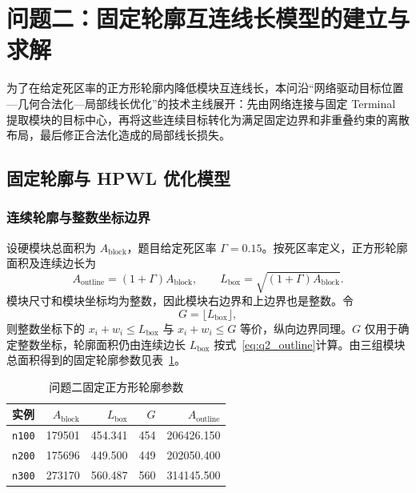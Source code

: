 \section{问题二：固定轮廓互连线长模型的建立与求解}

为了在给定死区率的正方形轮廓内降低模块互连线长，本问沿“网络驱动目标位置—几何合法化—局部线长优化”的技术主线展开：先由网络连接与固定 Terminal 提取模块的目标中心，再将这些连续目标转化为满足固定边界和非重叠约束的离散布局，最后修正合法化造成的局部线长损失。

\subsection{固定轮廓与 HPWL 优化模型}

\subsubsection{连续轮廓与整数坐标边界}

设硬模块总面积为 $A_{\mathrm{block}}$，题目给定死区率 $\Gamma=0.15$。按死区率定义，正方形轮廓面积及连续边长为
\begin{equation}
  A_{\mathrm{outline}}=(1+\Gamma)A_{\mathrm{block}},
  \qquad
  L_{\mathrm{box}}=\sqrt{(1+\Gamma)A_{\mathrm{block}}}.
  \label{eq:q2_outline}
\end{equation}
模块尺寸和模块坐标均为整数，因此模块右边界和上边界也是整数。令
\begin{equation}
  G=\lfloor L_{\mathrm{box}}\rfloor,
  \label{eq:q2_grid_side}
\end{equation}
则整数坐标下的 $x_i+w_i\le L_{\mathrm{box}}$ 与 $x_i+w_i\le G$ 等价，纵向边界同理。$G$ 仅用于确定整数坐标，轮廓面积仍由连续边长 $L_{\mathrm{box}}$ 按式~\eqref{eq:q2_outline}计算。由三组模块总面积得到的固定轮廓参数见表~\ref{tab:q2_outline_parameters}。

\begin{table}[H]
  \centering
  \caption{问题二固定正方形轮廓参数}
  \label{tab:q2_outline_parameters}
  \small
  \begin{tabular}{lrrrr}
    \toprule
    实例 & $A_{\mathrm{block}}$ & $L_{\mathrm{box}}$ & $G$ & $A_{\mathrm{outline}}$ \\
    \midrule
    \texttt{n100} & 179501 & 454.341 & 454 & 206426.150 \\
    \texttt{n200} & 175696 & 449.500 & 449 & 202050.400 \\
    \texttt{n300} & 273170 & 560.487 & 560 & 314145.500 \\
    \bottomrule
  \end{tabular}
\end{table}

